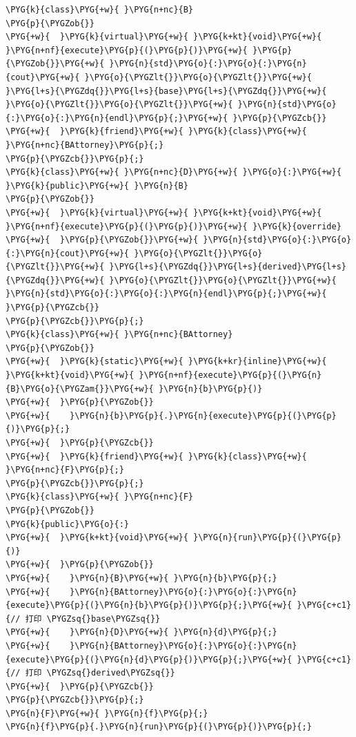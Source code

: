 
\begin{codeblockbg}
\begin{Verbatim}[commandchars=\\\{\},breaklines=true,breakanywhere=true,fontsize=\codefont,xleftmargin=17bp]
\PYG{k}{class}\PYG{+w}{ }\PYG{n+nc}{B}
\PYG{p}{\PYGZob{}}
\PYG{+w}{  }\PYG{k}{virtual}\PYG{+w}{ }\PYG{k+kt}{void}\PYG{+w}{ }\PYG{n+nf}{execute}\PYG{p}{(}\PYG{p}{)}\PYG{+w}{ }\PYG{p}{\PYGZob{}}\PYG{+w}{ }\PYG{n}{std}\PYG{o}{:}\PYG{o}{:}\PYG{n}{cout}\PYG{+w}{ }\PYG{o}{\PYGZlt{}}\PYG{o}{\PYGZlt{}}\PYG{+w}{ }\PYG{l+s}{\PYGZdq{}}\PYG{l+s}{base}\PYG{l+s}{\PYGZdq{}}\PYG{+w}{ }\PYG{o}{\PYGZlt{}}\PYG{o}{\PYGZlt{}}\PYG{+w}{ }\PYG{n}{std}\PYG{o}{:}\PYG{o}{:}\PYG{n}{endl}\PYG{p}{;}\PYG{+w}{ }\PYG{p}{\PYGZcb{}}
\PYG{+w}{  }\PYG{k}{friend}\PYG{+w}{ }\PYG{k}{class}\PYG{+w}{ }\PYG{n+nc}{BAttorney}\PYG{p}{;}
\PYG{p}{\PYGZcb{}}\PYG{p}{;}
\PYG{k}{class}\PYG{+w}{ }\PYG{n+nc}{D}\PYG{+w}{ }\PYG{o}{:}\PYG{+w}{ }\PYG{k}{public}\PYG{+w}{ }\PYG{n}{B}
\PYG{p}{\PYGZob{}}
\PYG{+w}{  }\PYG{k}{virtual}\PYG{+w}{ }\PYG{k+kt}{void}\PYG{+w}{ }\PYG{n+nf}{execute}\PYG{p}{(}\PYG{p}{)}\PYG{+w}{ }\PYG{k}{override}
\PYG{+w}{  }\PYG{p}{\PYGZob{}}\PYG{+w}{ }\PYG{n}{std}\PYG{o}{:}\PYG{o}{:}\PYG{n}{cout}\PYG{+w}{ }\PYG{o}{\PYGZlt{}}\PYG{o}{\PYGZlt{}}\PYG{+w}{ }\PYG{l+s}{\PYGZdq{}}\PYG{l+s}{derived}\PYG{l+s}{\PYGZdq{}}\PYG{+w}{ }\PYG{o}{\PYGZlt{}}\PYG{o}{\PYGZlt{}}\PYG{+w}{ }\PYG{n}{std}\PYG{o}{:}\PYG{o}{:}\PYG{n}{endl}\PYG{p}{;}\PYG{+w}{ }\PYG{p}{\PYGZcb{}}
\PYG{p}{\PYGZcb{}}\PYG{p}{;}
\PYG{k}{class}\PYG{+w}{ }\PYG{n+nc}{BAttorney}
\PYG{p}{\PYGZob{}}
\PYG{+w}{  }\PYG{k}{static}\PYG{+w}{ }\PYG{k+kr}{inline}\PYG{+w}{ }\PYG{k+kt}{void}\PYG{+w}{ }\PYG{n+nf}{execute}\PYG{p}{(}\PYG{n}{B}\PYG{o}{\PYGZam{}}\PYG{+w}{ }\PYG{n}{b}\PYG{p}{)}
\PYG{+w}{  }\PYG{p}{\PYGZob{}}
\PYG{+w}{    }\PYG{n}{b}\PYG{p}{.}\PYG{n}{execute}\PYG{p}{(}\PYG{p}{)}\PYG{p}{;}
\PYG{+w}{  }\PYG{p}{\PYGZcb{}}
\PYG{+w}{  }\PYG{k}{friend}\PYG{+w}{ }\PYG{k}{class}\PYG{+w}{ }\PYG{n+nc}{F}\PYG{p}{;}
\PYG{p}{\PYGZcb{}}\PYG{p}{;}
\PYG{k}{class}\PYG{+w}{ }\PYG{n+nc}{F}
\PYG{p}{\PYGZob{}}
\PYG{k}{public}\PYG{o}{:}
\PYG{+w}{  }\PYG{k+kt}{void}\PYG{+w}{ }\PYG{n}{run}\PYG{p}{(}\PYG{p}{)}
\PYG{+w}{  }\PYG{p}{\PYGZob{}}
\PYG{+w}{    }\PYG{n}{B}\PYG{+w}{ }\PYG{n}{b}\PYG{p}{;}
\PYG{+w}{    }\PYG{n}{BAttorney}\PYG{o}{:}\PYG{o}{:}\PYG{n}{execute}\PYG{p}{(}\PYG{n}{b}\PYG{p}{)}\PYG{p}{;}\PYG{+w}{ }\PYG{c+c1}{// 打印 \PYGZsq{}base\PYGZsq{}}
\PYG{+w}{    }\PYG{n}{D}\PYG{+w}{ }\PYG{n}{d}\PYG{p}{;}
\PYG{+w}{    }\PYG{n}{BAttorney}\PYG{o}{:}\PYG{o}{:}\PYG{n}{execute}\PYG{p}{(}\PYG{n}{d}\PYG{p}{)}\PYG{p}{;}\PYG{+w}{ }\PYG{c+c1}{// 打印 \PYGZsq{}derived\PYGZsq{}}
\PYG{+w}{  }\PYG{p}{\PYGZcb{}}
\PYG{p}{\PYGZcb{}}\PYG{p}{;}
\PYG{n}{F}\PYG{+w}{ }\PYG{n}{f}\PYG{p}{;}
\PYG{n}{f}\PYG{p}{.}\PYG{n}{run}\PYG{p}{(}\PYG{p}{)}\PYG{p}{;}
\end{Verbatim}
\end{codeblockbg}


